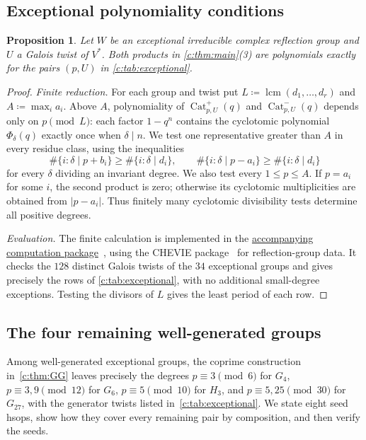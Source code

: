 \documentclass[11pt]{amsart}
\newcommand{\defeq}{\coloneqq}
\DeclareMathOperator{\Cat}{Cat}
\newtheorem{proposition}[theorem]{Proposition}
\theoremstyle{definition}
\begin{document}
\subsection{Exceptional polynomiality conditions}\label{c:sec:certificates}

\begin{proposition}\label{c:prop:exceptional-polynomiality}
Let $W$ be an exceptional irreducible complex reflection group and
$U$ a Galois twist of $V^*$. Both products in \cref{c:thm:main}(3)
are polynomials exactly for the pairs $(p,U)$ in \cref{c:tab:exceptional}.
\end{proposition}

\begin{proof}
\emph{Finite reduction.}
For each group and twist put $L\defeq\operatorname{lcm}(d_1,\ldots,d_r)$ and
$A\defeq\max_i a_i$. Above $A$, polynomiality of
$\Cat^+_{p,U}(q)$ and $\Cat^-_{p,U}(q)$
depends only on $p\pmod L$: each factor $1-q^n$ contains the
cyclotomic polynomial $\Phi_\delta(q)$ exactly once when $\delta\mid n$.
We test one representative greater than
$A$ in every residue class, using the inequalities
\[
 \#\{i:\delta\mid p+b_i\}\geq\#\{i:\delta\mid d_i\},
 \qquad
 \#\{i:\delta\mid p-a_i\}\geq\#\{i:\delta\mid d_i\}
\]
for every $\delta$ dividing an invariant degree. We also test every
$1\leq p\leq A$. If $p=a_i$ for some $i$, the second product is zero;
otherwise its cyclotomic multiplicities are obtained from $|p-a_i|$.
Thus finitely many cyclotomic divisibility tests determine all
positive degrees.

\emph{Evaluation.}
The finite calculation is implemented in the
\href{https://personal.utdallas.edu/~nxw170830/docs/algebraic-hsops/}{accompanying computation package}~\cite{Computations},
using the CHEVIE package~\cite{GHLMP,Michel} for reflection-group data.
It checks the $128$ distinct Galois twists of the $34$ exceptional
groups and gives precisely the rows of \cref{c:tab:exceptional},
with no additional small-degree exceptions. Testing the divisors of
$L$ gives the least period of each row.
\end{proof}

\subsection{The four remaining well-generated groups}\label{c:sec:seeds}

Among well-generated exceptional groups, the coprime construction
in~\cref{c:thm:GG} leaves precisely the degrees
$p\equiv3\pmod6$ for $G_4$,
$p\equiv3,9\pmod{12}$ for $G_6$,
$p\equiv5\pmod{10}$ for $H_3$, and
$p\equiv5,25\pmod{30}$ for $G_{27}$, with the generator twists
listed in~\cref{c:tab:exceptional}.
We state eight seed hsops, show how they cover every remaining pair
by composition, and then verify the seeds.
\end{document}
